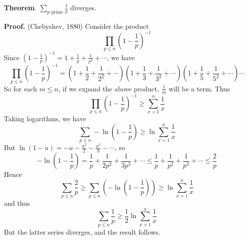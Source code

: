 \documentclass[12pt]{article}
\begin{document}
\textbf{Theorem}. $\sum_{p\text{ prime}}\frac{1}{p}$ diverges.

\textbf{Proof.} (Chebyshev, 1880)
\newline
Consider the product
\[\prod_{p\leq n} \left(1-\frac{1}{p}\right)^{-1}\]
Since $\left(1-\frac{1}{p}\right)^{-1}=1+\frac{1}{p}+\frac{1}{p^2}+\cdots$, we have
\[\prod_{p\leq n} \left(1-\frac{1}{p}\right)^{-1}=\left(1+\frac{1}{2}+\frac{1}{2^2}+\cdots\right)\left(1+\frac{1}{3}+\frac{1}{3^2}+\cdots\right)\left(1+\frac{1}{5}+\frac{1}{5^2}+\cdots\right)\cdots\]
So for each $m\leq n$, if we expand the above product, $\frac{1}{m}$ will be a term. Thus
\[\prod_{p\leq n}\left(1-\frac{1}{p}\right)^{-1}\geq\sum_{x=1}^n \frac{1}{x}\]
Taking logarithms, we have
\[\sum_{p\leq n}-\ln\left(1-\frac{1}{p}\right)\geq\ln\sum_{x=1}^n \frac{1}{x}\]
But $\ln(1-u)=-u-\frac{u^2}{2}-\frac{u^3}{3}-\cdots$, so
\[-\ln\left(1-\frac{1}{p}\right)=\frac{1}{p}+\frac{1}{2p^2}+\frac{1}{3p^3}+\cdots\leq \frac{1}{p}+\frac{1}{p^2}+\frac{1}{p^3}+\cdots\leq \frac{2}{p}\]
Hence
\[\sum_{p\leq n} \frac{2}{p}\geq \sum_{p\leq n}\left(-\ln\left(1-\frac{1}{p}\right)\right)\geq \ln\sum_{x=1}^{n}\frac{1}{x}\]
and thus
\[\sum_{p\leq n}\frac{1}{p}\geq \frac{1}{2}\ln\sum_{x=1}^{n}\frac{1}{x}\]
But the latter series diverges, and the result follows.

\end{document}
